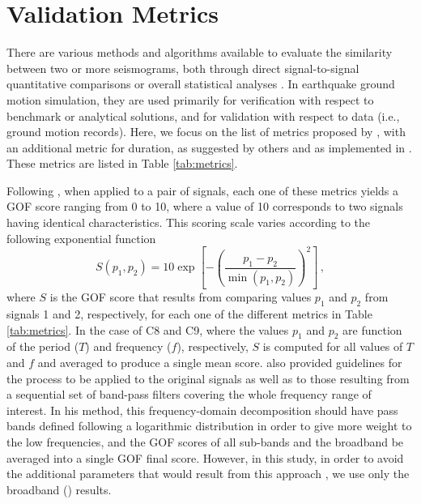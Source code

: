 
\section{Validation Metrics} 
\label{sec:validation-metrics}

There are various methods and algorithms available to evaluate the similarity between two or more seismograms, both through direct signal-to-signal quantitative comparisons or overall statistical analyses \citep[e.g.,][]{Anderson_2004_Proc, Kristekova_2006_BSSA, Kristekova_2009_GJI, Olsen_2010_SRL, Burks_BSSA_2014, Rezaeian_2015_BSSA}. In earthquake ground motion simulation, they are used primarily for verification with respect to benchmark or analytical solutions, and for validation with respect to data (i.e., ground motion records). Here, we focus on the list of metrics proposed by \citet{Anderson_2004_Proc}, with an additional metric for duration, as suggested by others \citep{Olsen_2010_SRL, Maufroy_2015_BSSA} and as implemented in \citet{Taborda_2013_BSSA}. These metrics are listed in Table \ref{tab:metrics}.



Following \citet{Anderson_2004_Proc}, when applied to a pair of signals, each one of these metrics yields a GOF score ranging from 0 to 10, where a value of 10 corresponds to two signals having identical characteristics. This scoring scale varies according to the following exponential function
% 
\begin{equation}
\label{eq:gof-function}
	S \left( p_1, p_2 \right) = 10 \exp{ \left[ - \left( \frac{p_1 - p_2}{ \min\left( p_1, p_2 \right) } \right)^2 \right] }
	\, ,
\end{equation}
% 
\noindent
where $S$ is the GOF score that results from comparing values $p_1$ and $p_2$ from signals 1 and 2, respectively, for each one of the different metrics in Table \ref{tab:metrics}. In the case of C8 and C9, where the values $p_1$ and $p_2$ are function of the period ($T$) and frequency ($f$), respectively, $S$ is computed for all values of $T$ and $f$ and averaged to produce a single mean score. \citeauthor{Anderson_2004_Proc} also provided guidelines for the process to be applied to the original signals as well as to those resulting from a sequential set of band-pass filters covering the whole frequency range of interest. In his method, this frequency-domain decomposition should have pass bands defined following a logarithmic distribution in order to give more weight to the low frequencies, and the GOF scores of all sub-bands and the broadband be averaged into a single GOF final score. However, in this study, in order to avoid the additional parameters that would result from this approach \citep[i.e., sub-bands width and filter characteristics][]{Khoshnevis_2015_Proc}, we use only the broadband () results.

